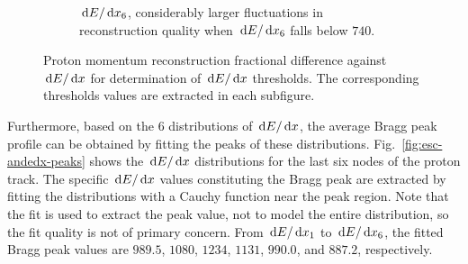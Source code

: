 \begin{figure}[!htb]
\begin{subfigure}[!htb]{\dbfigwid\textwidth}
           \caption{$\,\textrm{d}E/\,\textrm{d}x_6$, considerably larger fluctuations in reconstruction quality when $\,\textrm{d}E/\,\textrm{d}x_6$ falls below $740$.}
           \label{subfig:dedx5}
      \end{subfigure}
      \caption{Proton momentum reconstruction fractional difference against $\,\textrm{d}E/\,\textrm{d}x$ for determination of $\,\textrm{d}E/\,\textrm{d}x$ thresholds. The corresponding thresholds values are extracted in each subfigure.}
      \label{fig:esc-andedx-slice}
  \end{figure}

     Furthermore, based on the $6$ distributions of $\,\textrm{d}E/\,\textrm{d}x$, the average Bragg peak profile can be obtained by fitting the peaks of these distributions.
     Fig.~\ref{fig:esc-andedx-peaks} shows the $\,\textrm{d}E/\,\textrm{d}x$ distributions for the last six nodes of the proton track.
     The specific $\,\textrm{d}E/\,\textrm{d}x$ values constituting the Bragg peak are extracted by fitting the distributions with a Cauchy function near the peak region.
     Note that the fit is used to extract the peak value, not to model the entire distribution, so the fit quality is not of primary concern.
     From $\,\textrm{d}E/\,\textrm{d}x_1$ to $\,\textrm{d}E/\,\textrm{d}x_6$, the fitted Bragg peak values are $989.5$, $1080$, $1234$, $1131$, $990.0$, and $887.2$, respectively.

